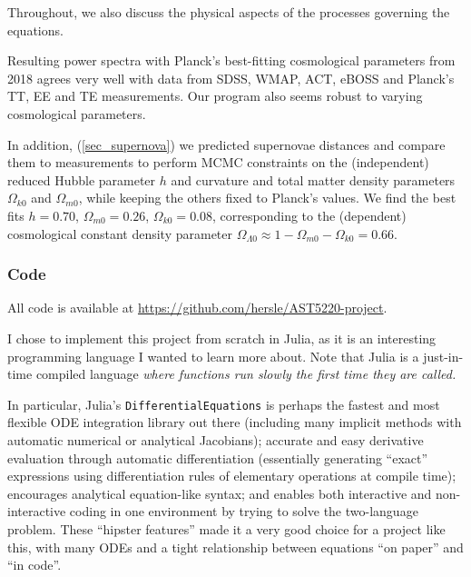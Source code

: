 \documentclass[10pt,a4paper]{article}
\begin{document}
	Throughout, we also discuss the physical aspects of the processes governing the equations.

	Resulting power spectra with Planck's best-fitting cosmological parameters from 2018
	agrees very well with data from SDSS, WMAP, ACT, eBOSS and Planck's TT, EE and TE measurements.
	Our program also seems robust to varying cosmological parameters.

	In addition, (\ref{sec_supernova})
	we predicted supernovae distances and compare them to measurements
	to perform MCMC constraints on the (independent) reduced Hubble parameter $h$ and curvature and total matter density parameters $\Omega_{k0}$ and $\Omega_{m0}$,
	while keeping the others fixed to Planck's values.
	We find the best fits $h = 0.70$, $\Omega_{m0} = 0.26$, $\Omega_{k0} = 0.08$,
	corresponding to the (dependent) cosmological constant density parameter $\Omega_{\Lambda 0} \approx 1 - \Omega_{m0} - \Omega_{k0} = 0.66$.

%


\bigskip \bigskip \bigskip

\subsubsection*{\centering Code}

All code is available at \href{https://github.com/hersle/AST5220-project}{https://github.com/hersle/AST5220-project}.

I chose to implement this project from scratch in Julia,
as it is an interesting programming language I wanted to learn more about.
Note that Julia is a just-in-time compiled language
\emph{where functions run slowly the first time they are called.}

In particular, Julia's \texttt{DifferentialEquations} is perhaps the fastest and most flexible ODE integration library out there
(including many implicit methods with automatic numerical or analytical Jacobians);
accurate and easy derivative evaluation through automatic differentiation
(essentially generating ``exact'' expressions using differentiation rules of elementary operations at compile time);
encourages analytical equation-like syntax;
and enables both interactive and non-interactive coding in one environment by trying to solve the two-language problem.
These ``hipster features'' made it a very good choice for a project like this,
with many ODEs and a tight relationship between equations ``on paper'' and ``in code''.
\end{document}
